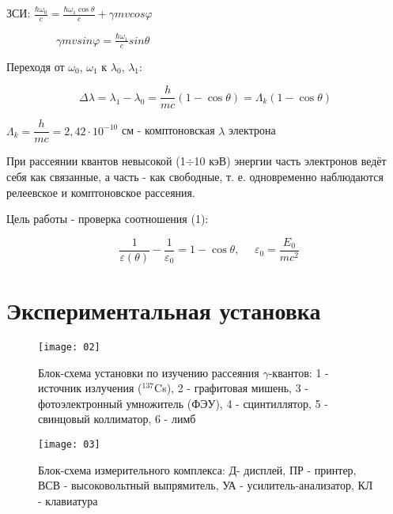 \documentclass[letterpaper,12pt]{article}
\begin{document}
	ЗСИ: $\frac{\hbar\omega_0}{c}=\frac{\hbar\omega_1\cos\theta}{c}+\gamma mvcos\varphi$
	\vspace{0.3cm}
	
	~~~~~~~~~$\gamma mvsin\varphi=\frac{\hbar\omega_1}{c}sin\theta$
	
	\pagebreak
	Переходя от $\omega_0$, $\omega_1$ к $\lambda_0$, $\lambda_1$:
	
	\begin{equation}
	\Delta\lambda=\lambda_1-\lambda_0=\dfrac{h}{mc}(1-\cos\theta)=\Lambda_k(1-\cos\theta)
	\end{equation}
	
	$\Lambda_k=\dfrac{h}{mc}=2,42\cdot 10^{-10}$ см - комптоновская $\lambda$ электрона
	
	
	\vspace{3mm}
		При рассеянии квантов невысокой (1$\div$10 кэВ) энергии часть электронов ведёт себя как связанные, а часть - как свободные, т. е. одновременно наблюдаются релеевское и комптоновское рассеяния.
		
		Цель работы - проверка соотношения (1):
		
		\begin{equation*}
		~~~\frac{1}{\varepsilon(\theta)}-\frac{1}{\varepsilon_0}=1-\cos\theta, ~~~~~~ 
		\varepsilon_0=\frac{E_0}{mc^2}
		\end{equation*}
		
	
	\section{Экспериментальная установка}
	
	
		\begin{figure} [tbh]
			\centering
		{\texttt{[image: 02]}}
			\caption{Блок-схема установки по изучению рассеяния $\gamma$-квантов: 1 - источник излучения ($^{137}$Cs), 2 - графитовая мишень, 3 - фотоэлектронный умножитель (ФЭУ), 4 - сцинтиллятор, 5 - свинцовый коллиматор, 6 - лимб }
		\end{figure}

	\begin{figure}[H]
		\centering
		\texttt{[image: 03]}
		\caption{Блок-схема измерительного комплекса: Д- дисплей, ПР - принтер, ВСВ - высоковольтный выпрямитель, УА - усилитель-анализатор, КЛ - клавиатура}
	\end{figure}
			
\end{document}
